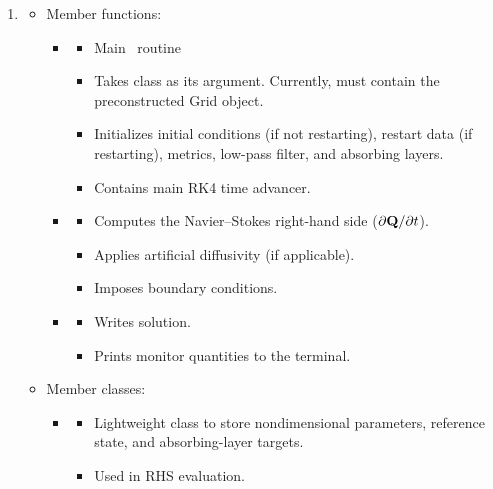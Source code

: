 \documentclass[letterpaper,10pt]{article}
\begin{document}
\begin{enumerate}
\item {}
  \vspace{-2mm}\begin{itemize}
  \item \textcolor{lc2}{Member functions:}
    \begin{itemize}
    \item {}
      \begin{itemize}
      \item Main \code\ routine
      \item Takes  class as its argument. Currently,  must contain the preconstructed Grid object.
      \item Initializes initial conditions (if not restarting), restart data (if restarting), metrics, low-pass filter, and absorbing layers.
      \item Contains main RK4 time advancer.
      \end{itemize}
      
    \item {}
      \begin{itemize}
      \item Computes the Navier--Stokes right-hand side ($\partial {\mathbf{Q}}/\partial t$).
      \item Applies artificial diffusivity (if applicable).
      \item Imposes boundary conditions.
      \end{itemize}
      
    \item {}
      \begin{itemize}
      \item Writes solution.
      \item Prints monitor quantities to the terminal.
      \end{itemize}
      
    \end{itemize}

  \item \textcolor{lc2}{Member classes:}
    \begin{itemize}
    \item {}
      \begin{itemize}
      \item Lightweight class to store nondimensional parameters, reference state, and absorbing-layer targets.
      \item Used in RHS evaluation.
      \end{itemize}
    \end{itemize}
  \end{itemize}


\end{enumerate}
\end{document}
